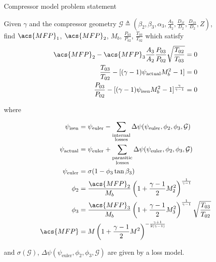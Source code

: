 \documentclass[tcc]{subfiles}
\begin{document}
\begin{table}
\centering
    \caption{Compressor model problem statement}
\begin{minipage}{0.7\textwidth}


    Given $\gamma$ and the compressor geometry 
    $\mathcal{G} \triangleq \left(
    \beta_2, \beta_3, \alpha_3, \tfrac{A_3}{A_2}, \tfrac{D_{1t}}{D_2}, \tfrac{D_{1h}}{D_2}, Z 
    \right)$, \\
    find $\acs{MFP}_1$, $\acs{MFP}_2$, $M_b$, $\frac{P_{03}}{P_{02}}$, $\frac{T_{03}}{T_{02}}$ 
    which satisfy
\begin{align}
    \acs{MFP}_2 - \acs{MFP}_3\frac{A_3}{A_2}\frac{P_{03}}{P_{02}}\sqrt{\frac{T_{02}}{T_{03}}}    &= 0 \\
    \frac{T_{03}}{T_{02}} - [(\gamma-1)\psi_{\text{actual}} M_b^2 - 1]                           &= 0 \\
    \frac{P_{03}}{P_{02}} - [(\gamma-1)\psi_{\text{isen}} M_b^2 - 1]^{\frac{\gamma}{\gamma-1}} &= 0 
\end{align}

where

\begin{align}
    \psi_{\text{isen}}   &= \psi_{\text{euler}}  - \sum_{\substack{\text{internal}\\\text{losses}}} \Delta \psi( \psi_{\text{euler}}, \phi_2, \phi_3, \mathcal{G})\\ 
    \psi_{\text{actual}}   &= \psi_{\text{euler}}  + \sum_{\substack{\text{parasitic}\\\text{losses}}} \Delta \psi( \psi_{\text{euler}}, \phi_2, \phi_3, \mathcal{G}) \\
    \psi_{\text{euler}} & = \sigma(1 - \phi_3 \tan\beta_3) \\
    \phi_2 &= \frac{\acs{MFP}_2}{M_b} \left( 1 + \frac{\gamma-1}{2} M_2^2 \right)^{\frac{1}{\gamma-1}} \\
    \phi_3 &= \frac{\acs{MFP}_3}{M_b} \left( 1 + \frac{\gamma-1}{2} M_3^2 \right)^{\frac{1}{\gamma-1}} \sqrt{\frac{T_{03}}{T_{02}}}\\
    \acs{MFP} &= M \left( 1 + \frac{\gamma-1}{2} M^2 \right)^{-\frac{\gamma+1}{2(\gamma-1)}}
\end{align}

    and 
    $\sigma(\mathcal{G})$, 
    $\Delta \psi( \psi_{\text{euler}}, \phi_2, \phi_3, \mathcal{G})$ 
    are given by a loss model.

\end{minipage}
\end{table}
\end{document}
